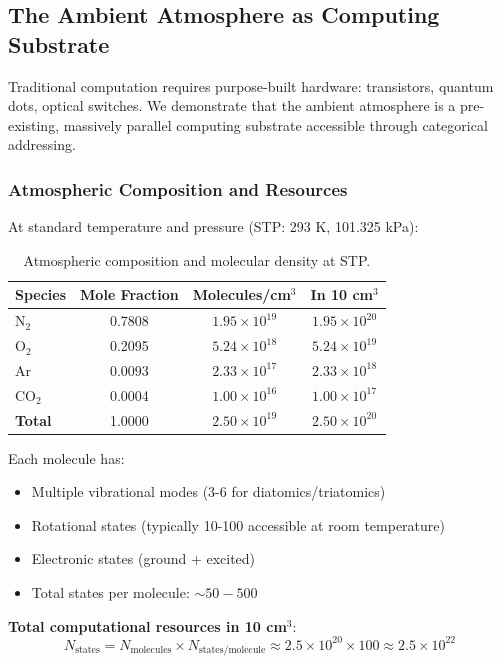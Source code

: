 
\subsection{The Ambient Atmosphere as Computing Substrate}

Traditional computation requires purpose-built hardware: transistors, quantum dots, optical switches. We demonstrate that the ambient atmosphere is a pre-existing, massively parallel computing substrate accessible through categorical addressing.

\subsubsection{Atmospheric Composition and Resources}

At standard temperature and pressure (STP: 293 K, 101.325 kPa):

\begin{table}[h]
\centering
\begin{tabular}{|l|c|c|c|}
\hline
\textbf{Species} & \textbf{Mole Fraction} & \textbf{Molecules/cm$^3$} & \textbf{In 10 cm$^3$} \\
\hline
N$_2$ & 0.7808 & $1.95 \times 10^{19}$ & $1.95 \times 10^{20}$ \\
O$_2$ & 0.2095 & $5.24 \times 10^{18}$ & $5.24 \times 10^{19}$ \\
Ar & 0.0093 & $2.33 \times 10^{17}$ & $2.33 \times 10^{18}$ \\
CO$_2$ & 0.0004 & $1.00 \times 10^{16}$ & $1.00 \times 10^{17}$ \\
\textbf{Total} & 1.0000 & $2.50 \times 10^{19}$ & $2.50 \times 10^{20}$ \\
\hline
\end{tabular}
\caption{Atmospheric composition and molecular density at STP.}
\end{table}

Each molecule has:
\begin{itemize}
\item Multiple vibrational modes (3-6 for diatomics/triatomics)
\item Rotational states (typically 10-100 accessible at room temperature)
\item Electronic states (ground + excited)
\item Total states per molecule: $\sim 50-500$
\end{itemize}

\textbf{Total computational resources in 10 cm$^3$}:
\begin{equation}
N_{\text{states}} = N_{\text{molecules}} \times N_{\text{states/molecule}} \approx 2.5 \times 10^{20} \times 100 \approx 2.5 \times 10^{22}
\end{equation}

